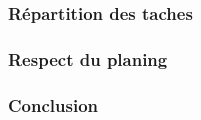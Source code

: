 \subsubsection{Répartition des taches}

\subsubsection{Respect du planing}

\subsubsection{Conclusion}
